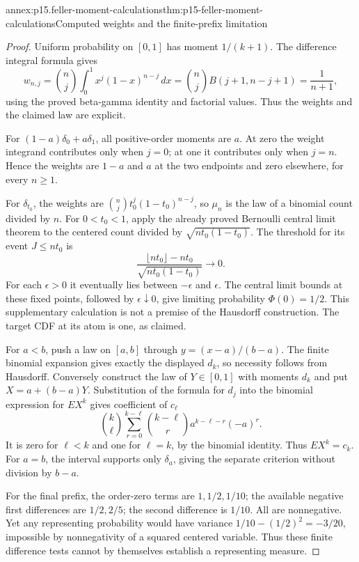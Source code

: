 \begin{annexitem}{annex:p15.feller-moment-calculations}{thm:p15-feller-moment-calculations}{Computed weights and the finite-prefix limitation}
\begin{proof}
Uniform probability on \([0,1]\) has moment \(1/(k+1)\).
The difference integral formula gives
\[
 w_{n,j}=\binom nj\int_0^1x^j(1-x)^{n-j}\,dx
         =\binom nj B(j+1,n-j+1)=\frac1{n+1},
\]
using the proved beta-gamma identity and factorial values.
Thus the weights and the claimed law are explicit.

For \((1-a)\delta_0+a\delta_1\), all positive-order moments are \(a\).
At zero the weight integrand contributes only when \(j=0\);
at one it contributes only when \(j=n\).
Hence the weights are \(1-a\) and \(a\) at the two endpoints and
zero elsewhere, for every \(n\geq1\).

For \(\delta_{t_0}\), the weights are
\(\binom njt_0^j(1-t_0)^{n-j}\), so \(\mu_n\) is the law of
a binomial count divided by \(n\).
For \(0<t_0<1\), apply the already proved Bernoulli central limit
theorem to the centered count divided by
\(\sqrt{nt_0(1-t_0)}\).
The threshold for its event \(J\leq nt_0\) is
\[
              \frac{\lfloor nt_0\rfloor-nt_0}
                         {\sqrt{nt_0(1-t_0)}}\longrightarrow0.
\]
For each \(\epsilon>0\) it eventually lies between
\(-\epsilon\) and \(\epsilon\).
The central limit bounds at these fixed points, followed by
\(\epsilon\downarrow0\), give limiting probability \(\Phi(0)=1/2\).
This supplementary calculation is not a premise of the Hausdorff
construction. The target CDF at its atom is one, as claimed.

For \(a<b\), push a law on \([a,b]\) through
\(y=(x-a)/(b-a)\).
The finite binomial expansion gives exactly the displayed \(d_k\),
so necessity follows from Hausdorff.
Conversely construct the law of \(Y\in[0,1]\) with moments \(d_k\)
and put \(X=a+(b-a)Y\).
Substitution of the formula for \(d_j\) into the binomial expression
for \(EX^k\) gives coefficient of \(c_\ell\)
\[
 \binom k\ell\sum_{r=0}^{k-\ell}\binom{k-\ell}r
                         a^{k-\ell-r}(-a)^r .
\]
It is zero for \(\ell<k\) and one for \(\ell=k\), by the binomial
identity. Thus \(EX^k=c_k\).
For \(a=b\), the interval supports only \(\delta_a\), giving the
separate criterion without division by \(b-a\).

For the final prefix, the order-zero terms are \(1,1/2,1/10\);
the available negative first differences are \(1/2,2/5\);
the second difference is \(1/10\). All are nonnegative.
Yet any representing probability would have variance
\(1/10-(1/2)^2=-3/20\), impossible by nonnegativity of a squared
centered variable. Thus these finite difference tests cannot by
themselves establish a representing measure.
\end{proof}
\end{annexitem}


